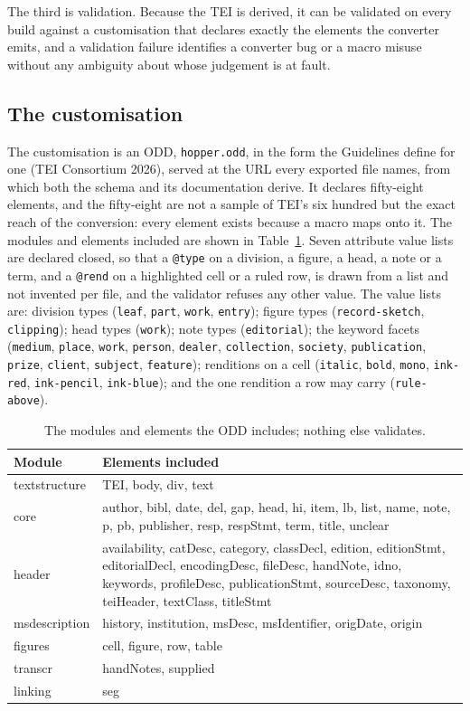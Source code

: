 \documentclass[11pt]{article}
\begin{document}
The third is validation. Because the TEI is derived, it can be validated on every build against a customisation that declares exactly the elements the converter emits, and a validation failure identifies a converter bug or a macro misuse without any ambiguity about whose judgement is at fault.

\subsection{The customisation}

The customisation is an ODD, \texttt{hopper.odd}, in the form the Guidelines define for one (TEI Consortium 2026), served at the URL every exported file names, from which both the schema and its documentation derive. It declares fifty-eight elements, and the fifty-eight are not a sample of TEI's six hundred but the exact reach of the conversion: every element exists because a macro maps onto it. The modules and elements included are shown in Table~\ref{tab:odd}. Seven attribute value lists are declared closed, so that a \texttt{@type} on a division, a figure, a head, a note or a term, and a \texttt{@rend} on a highlighted cell or a ruled row, is drawn from a list and not invented per file, and the validator refuses any other value. The value lists are: division types (\texttt{leaf}, \texttt{part}, \texttt{work}, \texttt{entry}); figure types (\texttt{record-sketch}, \texttt{clipping}); head types (\texttt{work}); note types (\texttt{editorial}); the keyword facets (\texttt{medium}, \texttt{place}, \texttt{work}, \texttt{person}, \texttt{dealer}, \texttt{collection}, \texttt{society}, \texttt{publication}, \texttt{prize}, \texttt{client}, \texttt{subject}, \texttt{feature}); renditions on a cell (\texttt{italic}, \texttt{bold}, \texttt{mono}, \texttt{ink-red}, \texttt{ink-pencil}, \texttt{ink-blue}); and the one rendition a row may carry (\texttt{rule-above}).

\begin{table}[htbp]\centering\small
\caption{The modules and elements the ODD includes; nothing else validates.}\label{tab:odd}
\begin{tabular}{lp{10cm}}\toprule
Module & Elements included\\\midrule
textstructure & TEI, body, div, text\\
core & author, bibl, date, del, gap, head, hi, item, lb, list, name, note, p, pb, publisher, resp, respStmt, term, title, unclear\\
header & availability, catDesc, category, classDecl, edition, editionStmt, editorialDecl, encodingDesc, fileDesc, handNote, idno, keywords, profileDesc, publicationStmt, sourceDesc, taxonomy, teiHeader, textClass, titleStmt\\
msdescription & history, institution, msDesc, msIdentifier, origDate, origin\\
figures & cell, figure, row, table\\
transcr & handNotes, supplied\\
linking & seg\\\bottomrule
\end{tabular}
\end{table}
\end{document}
